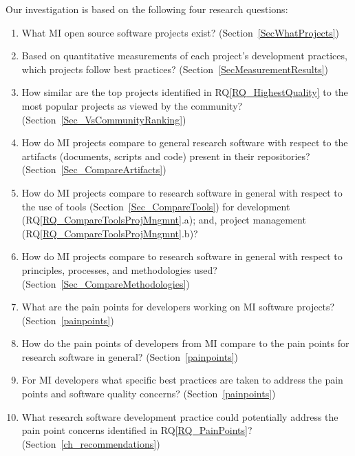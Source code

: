 \documentclass[final, 12pt, 3p, times]{elsarticle}
\newcounter{rqnum} %
\newcommand{\rqref}[1]{RQ\ref{#1}}
\newcounter{qnum} %
\begin{document}
Our investigation is based on the following four research questions:
\begin{enumerate}
\item[RQ\refstepcounter{rqnum}\therqnum \label{RQ_WhatProjects}:] What MI
{open source} software projects exist? (Section~\ref{SecWhatProjects})
\item [RQ\refstepcounter{rqnum}\therqnum \label{RQ_HighestQuality}:] Based on
quantitative measurements of each project's development practices, which
projects follow best practices? (Section~\ref{SecMeasurementResults})
\item [RQ\refstepcounter{rqnum}\therqnum \label{RQ_CompareHQ2Popular}:] How
similar are the top projects identified in \rqref{RQ_HighestQuality}
to the most popular projects as viewed by the community?
(Section~\ref{Sec_VsCommunityRanking})
\item [RQ\refstepcounter{rqnum}\therqnum \label{RQ_CompareArtifacts}:] How
do MI projects compare to general research software with respect to the
artifacts (documents, scripts and code) present in their repositories?
(Section~\ref{Sec_CompareArtifacts})
\item [RQ\refstepcounter{rqnum}\therqnum \label{RQ_CompareToolsProjMngmnt}:] How
do MI projects compare to research software in general with respect to the use
of tools (Section~\ref{Sec_CompareTools}) for development
(\rqref{RQ_CompareToolsProjMngmnt}.a); and, project management
(\rqref{RQ_CompareToolsProjMngmnt}.b)?
\item [RQ\refstepcounter{rqnum}\therqnum \label{RQ_CompareMethodologies}:]
How do MI projects compare to research software in general with respect to
principles, processes, and methodologies used?
(Section~\ref{Sec_CompareMethodologies})
\item [RQ\refstepcounter{rqnum}\therqnum \label{RQ_PainPoints}:] What are
the pain points for developers working on MI software projects?
(Section~\ref{painpoints})
\item [RQ\refstepcounter{rqnum}\therqnum \label{RQ_ComparePainPoints}:] How
do the pain points of developers from MI compare to the pain points
for research software in general? (Section~\ref{painpoints})
\item [RQ\refstepcounter{rqnum}\therqnum \label{RQ_Concerns}:] For MI
developers what specific best practices are taken to address the pain points
and software quality concerns? (Section~\ref{painpoints})
\item [RQ\refstepcounter{rqnum}\therqnum \label{RQ_Recommend}:]
What research software development practice could potentially address the
pain point concerns identified in \rqref{RQ_PainPoints}?
(Section~\ref{ch_recommendations})
\end{enumerate}
\end{document}
